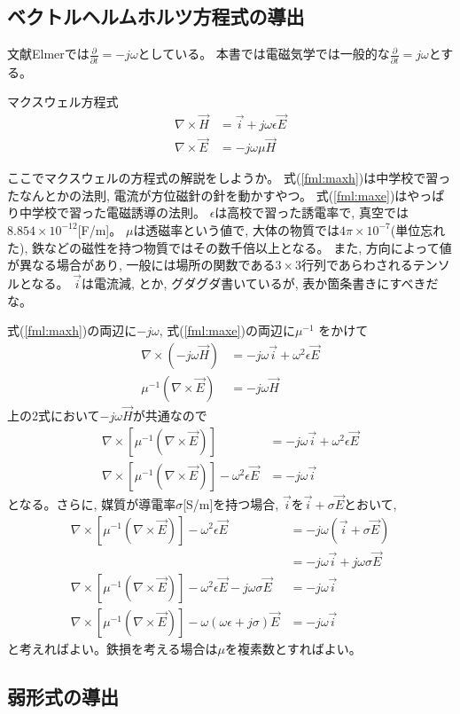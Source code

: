 \subsection{ベクトルヘルムホルツ方程式の導出}

文献Elmerでは$\frac{\partial}{\partial t}=-j\omega$としている。
本書では電磁気学では一般的な$\frac{\partial}{\partial t}=j\omega$とする。

マクスウェル方程式
\begin{align}
\nabla\times\vec{H}&=\vec{i}+j\omega\epsilon\vec{E}\label{fml:maxh}\\
\nabla\times\vec{E}&=-j\omega\mu\vec{H}\label{fml:maxe}
\end{align}

ここでマクスウェルの方程式の解説をしようか。
式(\ref{fml:maxh})は中学校で習ったなんとかの法則,
電流が方位磁針の針を動かすやつ。
式(\ref{fml:maxe})はやっぱり中学校で習った電磁誘導の法則。
$\epsilon$は高校で習った誘電率で,
真空では$8.854\times10^{-12}$[F/m]。
$\mu$は透磁率という値で,
大体の物質では$4\pi\times10^{-7}$(単位忘れた),
鉄などの磁性を持つ物質ではその数千倍以上となる。
また, 方向によって値が異なる場合があり,
一般には場所の関数である$3\times3$行列であらわされるテンソルとなる。
$\vec{i}$は電流減, とか, グダグダ書いているが, 表か箇条書きにすべきだな。

式(\ref{fml:maxh})の両辺に$-j\omega$,
式(\ref{fml:maxe})の両辺に$\mu^{-1}$ をかけて
\begin{align}
\nabla\times\left(-j\omega\vec{H}\right)
&=-j\omega\vec{i}+\omega^2\epsilon\vec{E}\\
\mu^{-1}\left(\nabla\times\vec{E}\right)
&=-j\omega\vec{H}
\end{align}
上の2式において$-j\omega\vec{H}$が共通なので
\begin{align}
\nabla\times\left[
\mu^{-1}\left(\nabla\times\vec{E}\right)
\right]
&=-j\omega\vec{i}+\omega^2\epsilon\vec{E}\\
\nabla\times\left[
\mu^{-1}\left(\nabla\times\vec{E}\right)
\right]-\omega^2\epsilon\vec{E}
&=-j\omega\vec{i}
\end{align}
となる。さらに, 媒質が導電率$\sigma$[S/m]を持つ場合,
$\vec{i}$を$\vec{i}+\sigma\vec{E}$とおいて,
\begin{align}
\nabla\times\left[
\mu^{-1}\left(\nabla\times\vec{E}\right)
\right]-\omega^2\epsilon\vec{E}
&=-j\omega\left(\vec{i}+\sigma\vec{E}\right)\\
&=-j\omega\vec{i}+j\omega\sigma\vec{E}\\
\nabla\times\left[
\mu^{-1}\left(\nabla\times\vec{E}\right)
\right]-\omega^2\epsilon\vec{E}-j\omega\sigma\vec{E}
&=-j\omega\vec{i}\\
\nabla\times\left[
\mu^{-1}\left(\nabla\times\vec{E}\right)
\right]-\omega\left(\omega\epsilon+j\sigma\right)\vec{E}
&=-j\omega\vec{i}
\end{align}
と考えればよい。鉄損を考える場合は$\mu$を複素数とすればよい。

\subsection{弱形式の導出}

